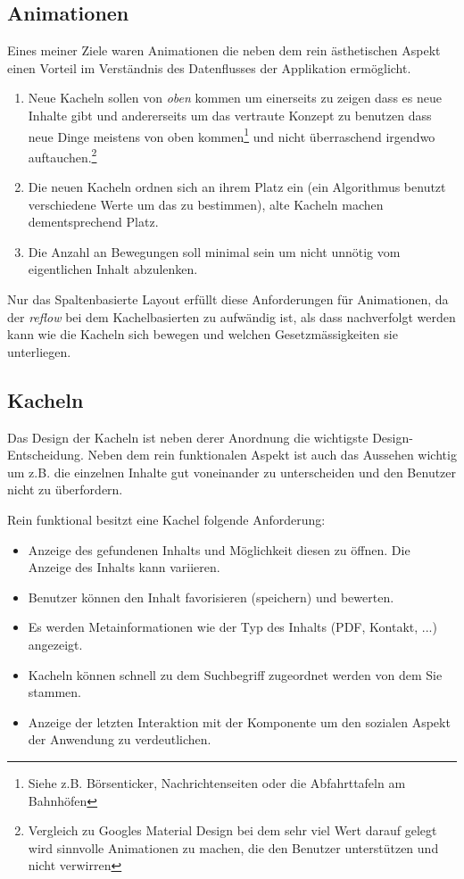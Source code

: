 \documentclass[12pt,twoside]{book}
\begin{document}
\subsection*{Animationen}

Eines meiner Ziele waren Animationen die neben dem rein ästhetischen Aspekt einen Vorteil im Verständnis des Datenflusses der Applikation ermöglicht.

\begin{enumerate}
  \item Neue Kacheln sollen von \textit{oben} kommen um einerseits zu zeigen dass es neue Inhalte gibt und andererseits um das vertraute Konzept zu benutzen dass neue Dinge meistens von oben kommen\footnote{Siehe z.B. Börsenticker, Nachrichtenseiten oder die Abfahrttafeln am Bahnhöfen} und nicht überraschend irgendwo auftauchen.\footnote{Vergleich zu Googles Material Design bei dem sehr viel Wert darauf gelegt wird sinnvolle Animationen zu machen, die den Benutzer unterstützen und nicht verwirren}
  \item Die neuen Kacheln ordnen sich an ihrem Platz ein (ein Algorithmus benutzt verschiedene Werte um das zu bestimmen), alte Kacheln machen dementsprechend Platz.
  \item Die Anzahl an Bewegungen soll minimal sein um nicht unnötig vom eigentlichen Inhalt abzulenken.
\end{enumerate}

Nur das Spaltenbasierte Layout erfüllt diese Anforderungen für Animationen, da der \textit{reflow} bei dem Kachelbasierten zu aufwändig ist, als dass nachverfolgt werden kann wie die Kacheln sich bewegen und welchen Gesetzmässigkeiten sie unterliegen.

\subsection*{Kacheln}

Das Design der Kacheln ist neben derer Anordnung die wichtigste Design-Entscheidung. Neben dem rein funktionalen Aspekt ist auch das Aussehen wichtig um z.B. die einzelnen Inhalte gut voneinander zu unterscheiden und den Benutzer nicht zu überfordern.

Rein funktional besitzt eine Kachel folgende Anforderung:

\begin{itemize}
  \item Anzeige des gefundenen Inhalts und Möglichkeit diesen zu öffnen. Die Anzeige des Inhalts kann variieren.
  \item Benutzer können den Inhalt favorisieren (speichern) und bewerten.
  \item Es werden Metainformationen wie der Typ des Inhalts (PDF, Kontakt, ...) angezeigt.
  \item Kacheln können schnell zu dem Suchbegriff zugeordnet werden von dem Sie stammen.
  \item Anzeige der letzten Interaktion mit der Komponente um den sozialen Aspekt der Anwendung zu verdeutlichen.
\end{itemize}
\end{document}
